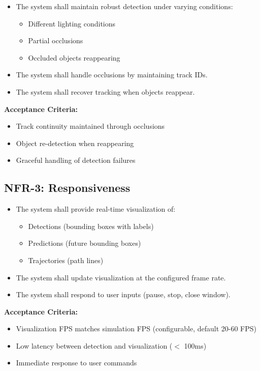 \begin{itemize}
    \item The system shall maintain robust detection under varying conditions:
    \begin{itemize}
        \item Different lighting conditions
        \item Partial occlusions
        \item Occluded objects reappearing
    \end{itemize}
    \item The system shall handle occlusions by maintaining track IDs.
    \item The system shall recover tracking when objects reappear.
\end{itemize}

\textbf{Acceptance Criteria:}
\begin{itemize}
    \item Track continuity maintained through occlusions
    \item Object re-detection when reappearing
    \item Graceful handling of detection failures
\end{itemize}

\subsection{NFR-3: Responsiveness}

\begin{itemize}
    \item The system shall provide real-time visualization of:
    \begin{itemize}
        \item Detections (bounding boxes with labels)
        \item Predictions (future bounding boxes)
        \item Trajectories (path lines)
    \end{itemize}
    \item The system shall update visualization at the configured frame rate.
    \item The system shall respond to user inputs (pause, stop, close window).
\end{itemize}

\textbf{Acceptance Criteria:}
\begin{itemize}
    \item Visualization FPS matches simulation FPS (configurable, default 20-60 FPS)
    \item Low latency between detection and visualization ($<$ 100ms)
    \item Immediate response to user commands
\end{itemize}

